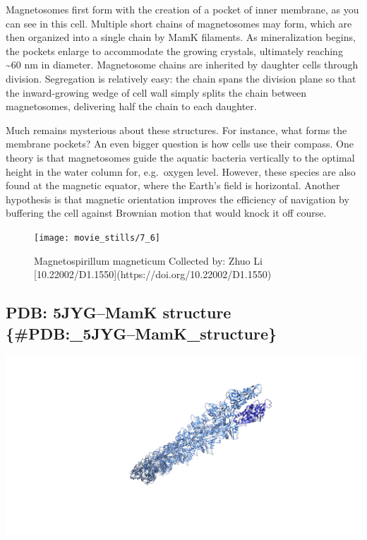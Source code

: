 \documentclass[]{tufte-book}
\begin{document}
Magnetosomes first form with the creation of a pocket of inner membrane,
as you can see in this cell. Multiple short chains of magnetosomes may
form, which are then organized into a single chain by MamK filaments. As
mineralization begins, the pockets enlarge to accommodate the growing
crystals, ultimately reaching \textasciitilde{}60 nm in diameter.
Magnetosome chains are inherited by daughter cells through division.
Segregation is relatively easy: the chain spans the division plane so
that the inward-growing wedge of cell wall simply splits the chain
between magnetosomes, delivering half the chain to each daughter.

Much remains mysterious about these structures. For instance, what forms
the membrane pockets? An even bigger question is how cells use their
compass. One theory is that magnetosomes guide the aquatic bacteria
vertically to the optimal height in the water column for, e.g.~oxygen
level. However, these species are also found at the magnetic equator,
where the Earth's field is horizontal. Another hypothesis is that
magnetic orientation improves the efficiency of navigation by buffering
the cell against Brownian motion that would knock it off course.

\begin{figure}
\texttt{[image: movie\_stills/7\_6]} \caption[Magnetospirillum magneticum Collected by]{Magnetospirillum magneticum Collected by: Zhuo Li [10.22002/D1.1550](https://doi.org/10.22002/D1.1550)}\label{fig:unnamed-chunk-131}
\end{figure}

\subsection{PDB: 5JYG--MamK structure
\{\#PDB:\_5JYG--MamK\_structure\}}\label{pdb-5jygmamk-structure-pdb_5jygmamk_structure}

\includegraphics{img/schematics/7_6_1}
\end{document}
